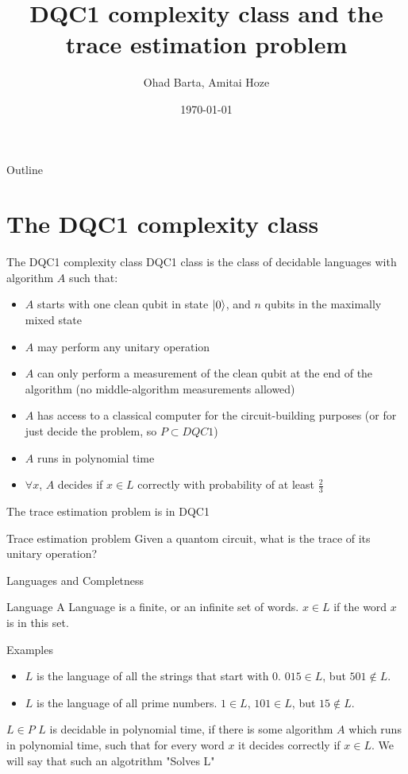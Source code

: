 \documentclass[leqno,fleqn]{beamer}
\author{Ohad Barta, Amitai Hoze}
\date{\today}
\title{DQC1 complexity class and the trace estimation problem}
\begin{document}
\maketitle
\begin{frame}{Outline}
\tableofcontents
\end{frame}


\section{The DQC1 complexity class}
\label{sec-1}
\begin{frame}[label=sec-1-1]{The DQC1 complexity class}
DQC1 class is the class of decidable languages with algorithm \(A\) such that:

\begin{itemize}
\item \(A\) starts with one clean qubit in state \(\left\vert{0}\right\rangle\), and \(n\) qubits in
the maximally mixed state
\item \(A\) may perform any unitary operation
\item \(A\) can only perform a measurement of the clean qubit at the end of
the algorithm (no middle-algorithm measurements allowed)
\item \(A\) has access to a classical computer for the circuit-building purposes (or for just decide the problem, so \(P \subset DQC1\))
\item \(A\) runs in polynomial time
\item \(\forall x\), \(A\) decides if \(x \in L\) correctly with probability of
at least \(\frac{2}{3}\)
\end{itemize}
\end{frame}
\begin{frame}[label=sec-1-2]{The trace estimation problem is in DQC1}
\begin{block}{Trace estimation problem}
Given a quantom circuit, what is the trace of its unitary operation?
\end{block}
\end{frame}
\begin{frame}[label=sec-1-3]{Languages and Completness}
\begin{block}{Language}
A Language is a finite, or an infinite set of words. \(x \in L\) if the word \(x\) is in this set.
\end{block}
\begin{block}{Examples}
\begin{itemize}
\item \(L\) is the language of all the strings that start with 0. \(015 \in L\),
but \(501 \notin L\).
\item \(L\) is the language of all prime numbers. \(1 \in L\), \(101 \in L\),
but \(15 \notin L\).
\end{itemize}
\end{block}
\begin{block}{\(L \in P\)}
\(L\) is decidable in polynomial time, if there is some algorithm \(A\) which runs in polynomial time, such that for every word \(x\)
it decides correctly if \(x \in L\). We will say that such an algotrithm "Solves L"
\end{block}
\end{frame}
\end{document}
